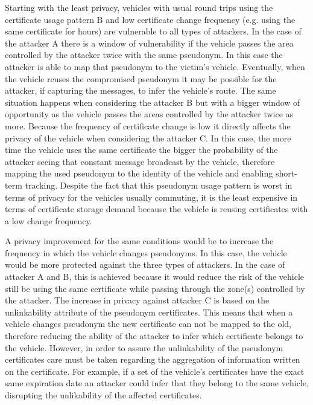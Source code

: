 Starting with the least privacy, vehicles with usual round trips using the certificate usage pattern B and low certificate change frequency (e.g. using the same certificate for hours) are vulnerable to all types of attackers. In the case of the attacker A there is a window of vulnerability if the vehicle passes the area controlled by the attacker twice with the same pseudonym. In this case the attacker is able to map that pseudonym to the victim's vehicle. Eventually, when the vehicle reuses the compromised pseudonym it may be possible for the attacker, if capturing the messages, to infer the vehicle's route. The same situation happens when considering the attacker B but with a bigger window of opportunity as the vehicle passes the areas controlled by the attacker twice as more. Because the frequency of certificate change is low it directly affects the privacy of the vehicle when considering the attacker C. In this case, the more time the vehicle uses the same certificate the bigger the probability of the attacker seeing that constant message broadcast by the vehicle, therefore mapping the used pseudonym to the identity of the vehicle and enabling short-term tracking. Despite the fact that this pseudonym usage pattern is worst in terms of privacy for the vehicles usually commuting, it is the least expensive in terms of certificate storage demand because the vehicle is reusing certificates with a low change frequency. 

A privacy improvement for the same conditions would be to increase the frequency in which the vehicle changes pseudonyms. In this case, the vehicle would be more protected against the three types of attackers. In the case of attacker A and B, this is achieved because it would reduce the risk of the vehicle still be using the same certificate while passing through the zone(s) controlled by the attacker. The increase in privacy against attacker C is based on the unlinkability attribute of the pseudonym certificates. This means that when a vehicle changes pseudonym the new certificate can not be mapped to the old, therefore reducing the ability of the attacker to infer which certificate belongs to the vehicle. However, in order to assure the unlinkability of the pseudonym certificates care must be taken regarding the aggregation of information written on the certificate. For example, if a set of the vehicle's certificates have the exact same expiration date an attacker could infer that they belong to the same vehicle, disrupting the unlikability of the affected certificates. 

